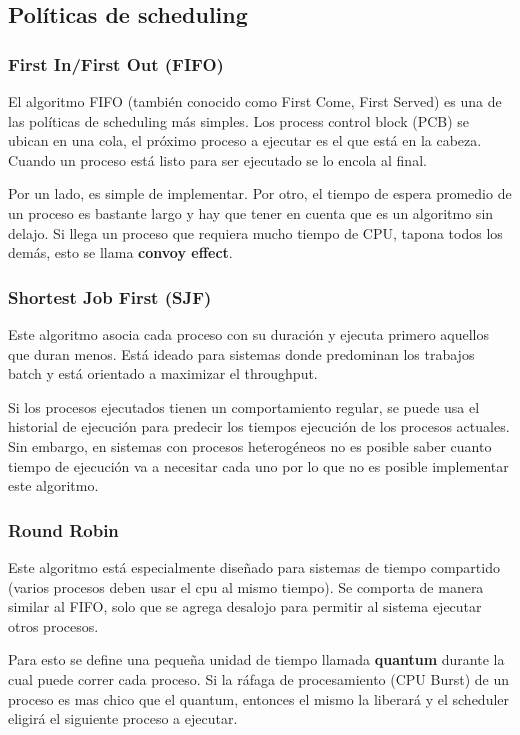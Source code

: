     \subsection{Políticas de scheduling}
    \subsubsection{First In/First Out (FIFO)}
    El algoritmo FIFO (también conocido como First Come, First Served) es una de las políticas de scheduling más simples. Los process control block (PCB) se ubican en una cola, el próximo proceso a ejecutar es el que está en la cabeza. Cuando un proceso está listo para ser ejecutado se lo encola al final.
    
    Por un lado, es simple de implementar. Por otro, el tiempo de espera promedio de un proceso es bastante largo y hay que tener en cuenta que es un algoritmo sin delajo. Si llega un proceso que requiera mucho tiempo de CPU, tapona todos los demás, esto se llama \textbf{convoy effect}.
    
    \subsubsection{Shortest Job First (SJF)}
    Este algoritmo asocia cada proceso con su duración y ejecuta primero aquellos que duran menos. Está ideado para sistemas donde predominan los trabajos batch y está orientado a maximizar el throughput.
    
    Si los procesos ejecutados tienen un comportamiento regular, se puede usa el historial de ejecución para predecir los tiempos ejecución de los procesos actuales. Sin embargo, en sistemas con procesos heterogéneos no es posible saber cuanto tiempo de ejecución va a necesitar cada uno por lo que no es posible implementar este algoritmo.
    
    \subsubsection{Round Robin}
    Este algoritmo está especialmente diseñado para sistemas de tiempo compartido (varios procesos deben usar el cpu al mismo tiempo). Se comporta de manera similar al FIFO, solo que se agrega desalojo para permitir al sistema ejecutar otros procesos.
    
    Para esto se define una pequeña unidad de tiempo llamada \textbf{quantum} durante la cual puede correr cada proceso. Si la ráfaga de procesamiento (CPU Burst) de un proceso es mas chico que el quantum, entonces el mismo la liberará y el scheduler eligirá el siguiente proceso a ejecutar.
    
